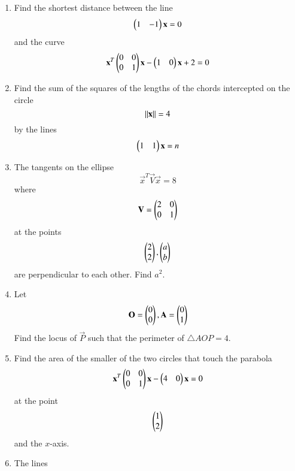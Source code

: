 \documentclass[journal,12pt,twocolumn]{IEEEtran}
\begin{document}
\begin{enumerate}[label=\arabic*.]
\begin{enumerate}
\end{enumerate}
\item Find the shortest distance between the line 
\begin{equation}
\begin{pmatrix}1 & -1 \end{pmatrix}\mathbf{x}  =0
\end{equation}
%
and the curve
\begin{equation}
\mathbf{x}^T\begin{pmatrix}0 & 0 \\ 0 & 1\end{pmatrix}\mathbf{x} - \begin{pmatrix}1 & 0\end{pmatrix}\mathbf{x} + 2 =0
\end{equation}
%
\item Find the sum of the squares of the lengths of the chords intercepted on the circle 
\begin{equation}
\left\Vert\mathbf{x}\right\Vert= 4
\end{equation}
by the lines
\begin{equation}
\begin{pmatrix}1 & 1 \end{pmatrix}\mathbf{x}  =n
\end{equation}
\item The tangents on the ellipse
\begin{equation}
\vec{x}^T\vec{V}\vec{x} =8
\end{equation}
%
where
\begin{equation}
\mathbf{V} = \begin{pmatrix}2 & 0 \\ 0 & 1\end{pmatrix}
\end{equation}
at the points 
\begin{equation}
 \begin{pmatrix}2 \\ 2\end{pmatrix}, \begin{pmatrix}a \\ b\end{pmatrix}
\end{equation}
%
are perpendicular to each other. Find $a^2$.
\item Let 
\begin{equation}
\mathbf{O} = \begin{pmatrix} 0 \\ 0 \end{pmatrix},
\mathbf{A} = \begin{pmatrix} 0 \\ 1 \end{pmatrix}
\end{equation}
Find the locus of $\vec{P}$ such that the perimeter of $\triangle AOP = 4$.
\item Find the area of the smaller of the two circles that touch the parabola 
\begin{equation}
\mathbf{x}^T\begin{pmatrix}0 & 0 \\ 0 & 1\end{pmatrix}\mathbf{x} - \begin{pmatrix}4 & 0\end{pmatrix}\mathbf{x}  =0
\end{equation}
at the point 
\begin{equation}
\begin{pmatrix} 1 \\ 2 \end{pmatrix}
\end{equation}
and the $x$-axis.
\item The lines 
\begin{align}

\end{align}
\end{enumerate}
\end{document}
